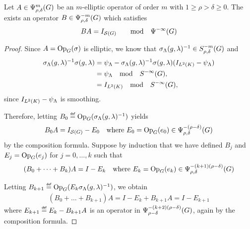 \begin{theorem}
    Let $A \in \Psi^{m}_{\rho, \delta}(G)$ be an $m$-elliptic operator of order $m$ with $1 \geq \rho > \delta \geq 0$.
    The exists an operator $B \in \Psi^{-m}_{\rho, \delta}(G)$ which satisfies
    \begin{align*}
        B A = {I_{{\mathcal{S} (G)}}} \qquad \text{mod} \quad {\Psi^{-\infty} (G)}
    \end{align*}
\end{theorem}
\begin{proof}
    Since $A = \mathrm{Op}_{G}(\sigma)$ is elliptic,
    we know that $\sigma_\Lambda(g, \lambda)^{-1} \in S^{-m}_{\rho, \delta}(G)$ and
    \begin{align*}
        \sigma_\Lambda(g, \lambda)^{-1} \sigma(g, \lambda)
        &= \psi_\Lambda - \sigma_\Lambda(g, \lambda)^{-1} \sigma(g, \lambda) ({I_{{L^{2} (K)}}} - \psi_\Lambda)\\
        &= \psi_\Lambda \quad \text{mod} \quad {S^{-\infty} (G)},\\
        &= {I_{{L^{2} (K)}}} \quad \text{mod} \quad {S^{-\infty} (G)},
    \end{align*}
    since ${I_{{L^{2} (K)}}} - \psi_\Lambda$ is smoothing.

    Therefore,
    letting $B_0 \defeq \Op(\sigma_\Lambda(g, \lambda)^{-1})$ yields
    \begin{align*}
        B_0 A = {I_{{\mathcal{S} (G)}}} - E_0 \quad \text{where } E_0 = \mathrm{Op}_{G}(e_0) \in \Psi^{-(\rho - \delta)}_{\rho, \delta}(G)
    \end{align*}
    by the composition formula.
    Suppose by induction that we have defined $B_j$ and $E_j = \mathrm{Op}_{G}(e_j)$ for $j = 0, \dots, k$ such that
    \begin{align*}
        (B_0 + \dots + B_k) A = I - E_k \quad \text{where } E_k = \mathrm{Op}_{G}(e_k) \in \Psi^{-(k + 1)(\rho - \delta)}_{\rho, \delta}(G)
    \end{align*}

    Letting $B_{k + 1} \defeq \Op(E_k \sigma_\Lambda(g, \lambda)^{-1})$,
    we obtain
    \begin{align*}
        (B_0 + \dots + B_{k + 1}) A = I - E_k + B_{k + 1} A = I - E_{k + 1}
    \end{align*}
    where $E_{k + 1} \defeq E_k - B_{k + 1} A$ is an operator in $\Psi^{-(k + 2)(\rho - \delta)}_{\rho - \delta}(G)$,
    again by the composition formula.


\end{proof}
